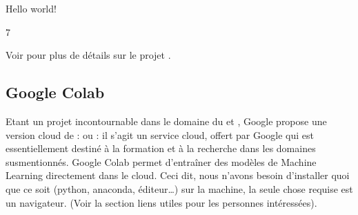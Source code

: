 \documentclass[letterpaper,10pt,french]{sphinxmanual}
\begin{document}
\begin{sphinxVerbatim}[commandchars=\\\{\}]
\end{sphinxVerbatim}

\begin{sphinxVerbatim}[commandchars=\\\{\}]
Hello world!
\end{sphinxVerbatim}

\begin{sphinxVerbatim}[commandchars=\\\{\}]
7
\end{sphinxVerbatim}

\sphinxAtStartPar
Voir  pour plus de détails sur le projet .


\subsection{Google Colab}
\label{\detokenize{ch01:google-colab}}
\sphinxAtStartPar
Etant un projet incontournable dans le domaine du  et , Google propose une version cloud de :   ou : il s’agit un service cloud, offert par Google qui est essentiellement destiné à la formation et à la recherche dans les domaines susmentionnés. Google Colab permet d’entraîner des modèles de Machine Learning directement dans le cloud. Ceci dit, nous n’avons besoin d’installer quoi que ce soit (python, anaconda, éditeur…) sur la machine, la seule chose requise est un navigateur. (Voir la section liens utiles pour les personnes intéressées).
\end{document}
